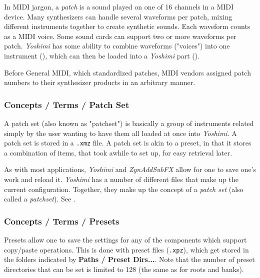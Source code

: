    In MIDI jargon, a \textsl{patch} is a sound played on
   one of 16 channels in a MIDI device. Many synthesizers
   can handle several waveforms per patch, mixing different
   instruments together to create synthetic sounds. Each waveform counts as
   a MIDI voice. Some sound cards can support two or more waveforms per
   patch.  \textsl{Yoshimi} has some ability to combine waveforms ("voices")
   into one instrument (),
   which can then be loaded into a
   \textsl{Yoshimi} part ().

   Before General MIDI, which standardized patches, MIDI vendors assigned
   patch numbers to their synthesizer products in an arbitrary manner.

\subsubsection{Concepts / Terms / Patch Set}
\label{subsubsec:concepts_terms_patch_set}

   A patch set (also known as "patchset")
   is basically a group of instruments related simply by the user
   wanting to have them all loaded at once into \textsl{Yoshimi}.
   A patch set is stored in a \texttt{.xmz} file.
   A patch set is akin to a preset, in that it stores a combination of
   items, that took awhile to set up, for easy retrieval later.

   As with most applications, \textsl{Yoshimi} and \textsl{ZynAddSubFX}
   allow for one to save one's work and reload it.
   \textsl{Yoshimi} has a number of different files that make up the current
   configuration.
   Together, they make up the concept of a \textsl{patch set} (also called a
   \textsl{patchset}).
   See .

\subsubsection{Concepts / Terms / Presets}
\label{subsubsec:concepts_terms_preset}

   Presets allow one to save the
   settings for any of the components which support copy/paste operations.
   This is done with preset files (\texttt{.xpz}), which get stored in the
   folders indicated by \textbf{Paths / Preset Dirs...}.
   Note that the number of preset directories that can be set is limited to 128
   (the same as for roots and banks).

